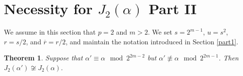 \documentclass{amsart}
\newtheorem{theorem}{Theorem}[section]
\theoremstyle{definition}
\theoremstyle{remark}
\begin{document}
\section{Necessity for $J_2(\alpha)$ Part II}\label{siete}

We assume in this section that $p=2$ and $m>2$. We set $s=2^{m-1}$, $u=s^2$, $r=s/2$, and $\overline{r}=r/2$,
and maintain the notation introduced in Section \ref{part1}.


\begin{theorem}\label{necj22} Suppose that $\alpha'\equiv\alpha\mod 2^{2m-2}$ but
$\alpha'\not\equiv\alpha\mod 2^{2m-1}$. Then $J_2(\alpha')\not\cong J_2(\alpha)$.
\end{theorem}
\end{document}
